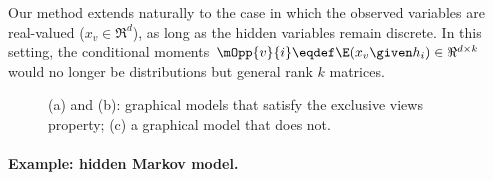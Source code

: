 Our method extends naturally to the case in which the observed variables
  are real-valued ($x_v \in \Re^d$), as long as the hidden variables remain discrete. 
In this setting, the conditional moments
  $\mOpp{v}{i} \eqdef \E(x_v \given h_i) \in \Re^{d \times k}$
  would no longer be distributions but general rank $k$ matrices.

\begin{figure}
  \centering
  \caption{(a) and (b): graphical models that satisfy the exclusive views property;
  (c) a graphical model that does not.}
  \label{fig:examples}
\end{figure}


\paragraph{Example: hidden Markov model.}

